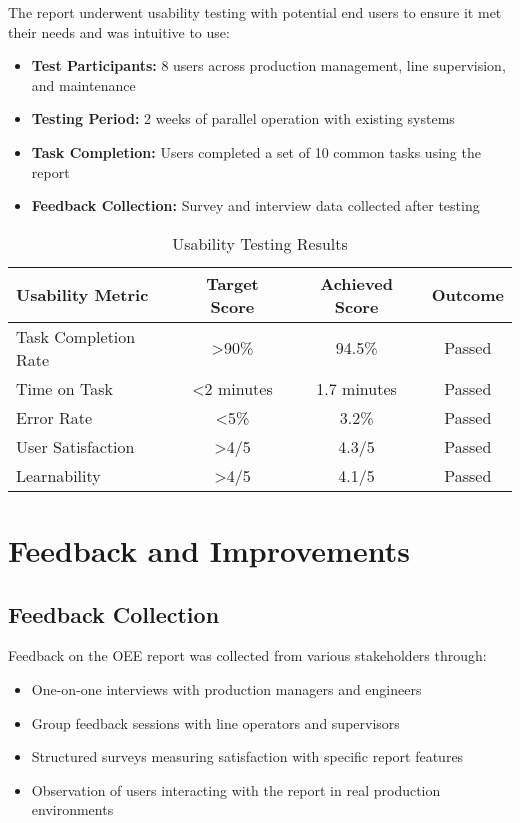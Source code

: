 \documentclass[11pt,a4paper]{article}
\begin{document}
The report underwent usability testing with potential end users to ensure it met their needs and was intuitive to use:

\begin{itemize}
    \item \textbf{Test Participants:} 8 users across production management, line supervision, and maintenance
    \item \textbf{Testing Period:} 2 weeks of parallel operation with existing systems
    \item \textbf{Task Completion:} Users completed a set of 10 common tasks using the report
    \item \textbf{Feedback Collection:} Survey and interview data collected after testing
\end{itemize}

\begin{table}[H]
    \centering
    \begin{tabular}{lccc}
        \toprule
        \textbf{Usability Metric} & \textbf{Target Score} & \textbf{Achieved Score} & \textbf{Outcome} \\
        \midrule
        Task Completion Rate & >90\% & 94.5\% & Passed \\
        Time on Task & <2 minutes & 1.7 minutes & Passed \\
        Error Rate & <5\% & 3.2\% & Passed \\
        User Satisfaction & >4/5 & 4.3/5 & Passed \\
        Learnability & >4/5 & 4.1/5 & Passed \\
        \bottomrule
    \end{tabular}
    \caption{Usability Testing Results}
    \label{tab:usability}
\end{table}

\section{Feedback and Improvements}

\subsection{Feedback Collection}

Feedback on the OEE report was collected from various stakeholders through:

\begin{itemize}
    \item One-on-one interviews with production managers and engineers
    \item Group feedback sessions with line operators and supervisors
    \item Structured surveys measuring satisfaction with specific report features
    \item Observation of users interacting with the report in real production environments
\end{itemize}
\end{document}
